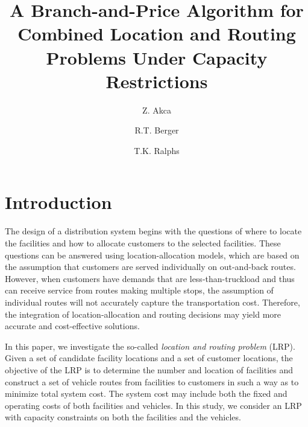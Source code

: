\documentclass[graybox]{./styles/svmult}
\begin{document}
  \title*{A Branch-and-Price Algorithm for Combined Location and Routing Problems Under Capacity Restrictions}
\author{Z. Akca \and R.T. Berger \and T.K. Ralphs}

\maketitle
{}
   
\section {Introduction}
The design of a distribution system begins with the questions of where
to locate the facilities and how to allocate customers to the selected
facilities. These questions can be answered
using location-allocation models, which are based on the assumption that
customers are served individually on out-and-back routes. However, when
customers have demands that are
less-than-truckload and thus can receive service from routes
making multiple stops, the assumption of individual routes will not
accurately capture the transportation cost. Therefore, the integration
of location-allocation and routing decisions may yield more accurate
and cost-effective solutions.

In this paper, we investigate the so-called \emph{location and routing
problem} (LRP). Given a set of candidate facility locations and a set
of customer locations, the objective of the LRP is to determine the
number and location of facilities and construct a set of vehicle
routes from facilities to customers in such a way as to minimize total
system cost. The system cost may include both the fixed and operating
costs of both facilities and vehicles. In this study, we consider an
LRP with capacity constraints on both the facilities and the vehicles.
\end{document}
